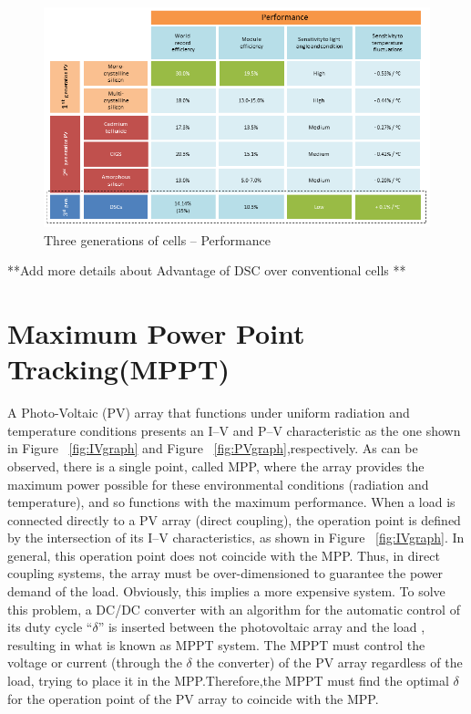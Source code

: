    
  \begin{figure}[H]
  \begin{center}
  \includegraphics[width=\textwidth]{images/3rd_gen}
  \caption{ Three generations of cells –  Performance}
  \label{fig:3rd_gen}
  \end{center}
  \end{figure}
 
  **Add more details about Advantage of DSC over conventional cells **\\
 
   
\section{Maximum Power Point Tracking(MPPT)}

A Photo-Voltaic (PV) array that functions under uniform radiation and temperature conditions presents an I–V and P–V characteristic as the one shown in Figure ~\ref{fig:IVgraph} and Figure ~\ref{fig:PVgraph},respectively. As can be observed, there is a single point, called \ac{MPP}, where the array provides the maximum power possible for these environmental conditions (radiation and temperature), and so functions with the maximum performance. When a load is connected directly to a PV array (direct coupling), the operation point is defined by the intersection of its I–V characteristics, as shown in Figure ~\ref{fig:IVgraph}. In general, this operation point does not coincide with the \ac{MPP}. Thus, in direct coupling systems, the array must be over-dimensioned to guarantee the power demand of the load. Obviously, this implies a more expensive system. To solve this problem, a DC/DC  converter with an algorithm for the automatic control of its duty cycle “${\delta}$” is inserted between the photovoltaic array and the load , resulting in what is known as \ac{MPPT} system. The MPPT must control the voltage or current (through the ${\delta}$ the converter) of the PV array regardless of the load, trying to place it in the \ac{MPP}.Therefore,the MPPT must find the optimal ${\delta}$ for the operation point of the PV array to coincide with the \ac{MPP}\cite{enrique2010reliable}.\\

